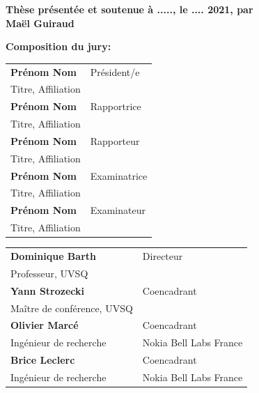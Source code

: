 \begin{titlepage}
\textbf{Thèse présentée et soutenue à ....., le .... 2021, par}\\
\bigskip
\Large {\color{Prune} \textbf{Maël Guiraud}}


\vspace{\fill} %

\flushleft \small \textbf{Composition du jury:}
\bigskip



\scriptsize
\begin{tabular}{|p{8cm}l}
\arrayrulecolor{Prune}
\textbf{Prénom Nom} &   Président/e\\ 
Titre, Affiliation & \\
\textbf{Prénom Nom} &  Rapportrice \\ 
Titre, Affiliation   &   \\ 
\textbf{Prénom Nom} &  Rapporteur \\ 
Titre, Affiliation  &   \\ 
\textbf{Prénom Nom} &  Examinatrice \\ 
Titre, Affiliation   &   \\ 
\textbf{Prénom Nom} &  Examinateur \\ 
Titre, Affiliation   &   \\ 


\end{tabular} 

\medskip
\begin{tabular}{|p{8cm}l}\arrayrulecolor{white}
\textbf{Dominique Barth} &   Directeur\\ 
Professeur, UVSQ & \\
\textbf{Yann Strozecki} &   Coencadrant\\ 
Maître de conférence, UVSQ  &   \\ 
\textbf{Olivier Marcé} &  Coencadrant \\ 
Ingénieur de recherche  & Nokia Bell Labs France  \\ 
\textbf{Brice Leclerc} &  Coencadrant \\ 
Ingénieur de recherche  & Nokia Bell Labs France  \\ 

\end{tabular} 


\end{titlepage}
\ifthispageodd{\newpage\thispagestyle{empty}\null\newpage}{}
\thispagestyle{empty}
\selectfont


